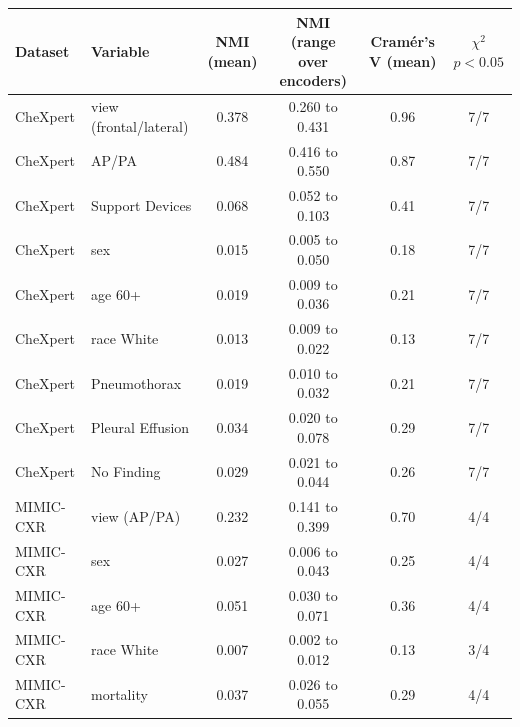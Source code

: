 \begin{tabular}{llcccc}
\toprule
Dataset & Variable & NMI (mean) & NMI (range over encoders) & Cram\'er's V (mean) & $\chi^2$ $p<0.05$ \\
\midrule
CheXpert & view (frontal/lateral) & 0.378 & 0.260 to 0.431 & 0.96 & 7/7 \\
CheXpert & AP/PA & 0.484 & 0.416 to 0.550 & 0.87 & 7/7 \\
CheXpert & Support Devices & 0.068 & 0.052 to 0.103 & 0.41 & 7/7 \\
CheXpert & sex & 0.015 & 0.005 to 0.050 & 0.18 & 7/7 \\
CheXpert & age 60+ & 0.019 & 0.009 to 0.036 & 0.21 & 7/7 \\
CheXpert & race White & 0.013 & 0.009 to 0.022 & 0.13 & 7/7 \\
CheXpert & Pneumothorax & 0.019 & 0.010 to 0.032 & 0.21 & 7/7 \\
CheXpert & Pleural Effusion & 0.034 & 0.020 to 0.078 & 0.29 & 7/7 \\
CheXpert & No Finding & 0.029 & 0.021 to 0.044 & 0.26 & 7/7 \\
\midrule
MIMIC-CXR & view (AP/PA) & 0.232 & 0.141 to 0.399 & 0.70 & 4/4 \\
MIMIC-CXR & sex & 0.027 & 0.006 to 0.043 & 0.25 & 4/4 \\
MIMIC-CXR & age 60+ & 0.051 & 0.030 to 0.071 & 0.36 & 4/4 \\
MIMIC-CXR & race White & 0.007 & 0.002 to 0.012 & 0.13 & 3/4 \\
MIMIC-CXR & mortality & 0.037 & 0.026 to 0.055 & 0.29 & 4/4 \\
\bottomrule
\end{tabular}

